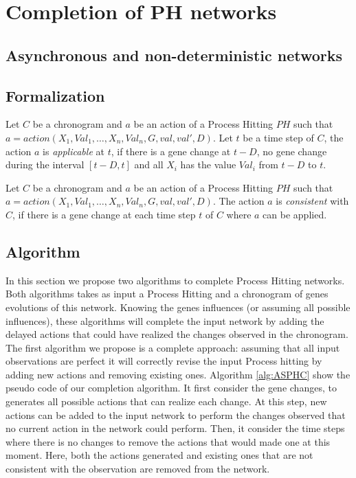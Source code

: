 
\section{Completion of PH networks}

\subsection{Asynchronous and non-deterministic networks}

\subsection{Formalization}

\begin{definition}[Applicability]
	Let $C$ be a chronogram and $a$ be an action of a Process Hitting $PH$ such that $a = action(X_1,Val_1,\ldots, X_n,Val_n, G, val, val', D)$.
	Let $t$ be a time step of $C$, the action $a$ is {\it applicable} at $t$,
	if there is a gene change at $t-D$, no gene change during the interval $[t-D,t]$ and all $X_i$ has the value $Val_i$ from $t-D$ to $t$.
\end{definition}


\begin{definition}[Consistency]
	Let $C$ be a chronogram and $a$ be an action of a Process Hitting $PH$ such that $a = action(X_1,Val_1,\ldots, X_n,Val_n, G, val, val', D)$.
	The action $a$ is {\it consistent} with $C$, if there is a gene change at each time step $t$ of $C$ where $a$ can be applied.
\end{definition}

\subsection{Algorithm}

In this section we propose two algorithms to complete Process Hitting networks.
Both algorithms takes as input a Process Hitting and a chronogram of genes evolutions of this network.
Knowing the genes influences (or assuming all possible influences),
these algorithms will complete the input network by adding the delayed actions that could have realized the changes observed in the chronogram.
The first algorithm we propose is a complete approach:
assuming that all input observations are perfect it will correctly revise the input Process hitting by adding new actions and removing existing ones.
Algorithm \ref{alg:ASPHC} show the pseudo code of our completion algorithm.
It first consider the gene changes, to generates all possible actions that can realize each change.
At this step, new actions can be added to the input network to perform the changes observed that no current action in the network could perform.
Then, it consider the time steps where there is no changes to remove the actions that would made one at this moment.
Here, both the actions generated and existing ones that are not consistent with the observation are removed from the network.

